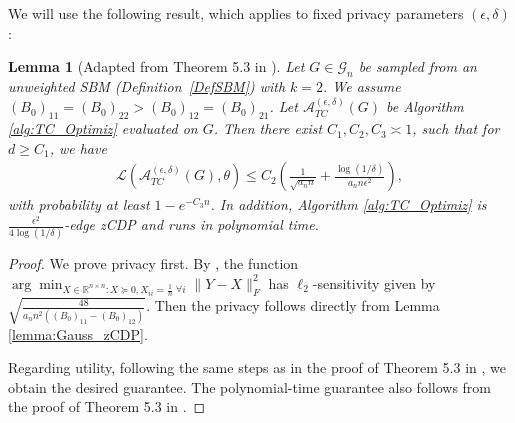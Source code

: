 \documentclass{article}
\newtheorem{lemma}{Lemma}
\newcommand{\real}{\mathbb{R}}
\begin{document}
We will use the following result, which applies to fixed privacy parameters $(\epsilon, \delta)$:

\begin{lemma}[Adapted from Theorem 5.3 in \cite{CheEtal23}]
\label{lemma:ChenPriv+Ut}
Let $G \in \mathcal{G}_n$ be sampled from an unweighted SBM (Definition~\ref{DefSBM}) with $k = 2$. We assume $(B_0)_{11} = (B_0)_{22} > (B_0)_{12} = (B_0)_{21}$. Let $\mathcal{A}_{TC}^{(\epsilon, \delta)}(G)$ be Algorithm \ref{alg:TC_Optimiz} evaluated on $G$. Then there exist $C_1, C_2, C_3 \asymp 1$, such that for $d \geq C_1$, we have  
\begin{align*}
\mathcal{L}\left(\mathcal{A}_{TC}^{(\epsilon, \delta)}(G), \theta\right) \leq C_2\left(\frac{1}{\sqrt{a_n n}} + \frac{\log(1/\delta)}{a_n n\epsilon^2}\right),
\end{align*}
with probability at least $1 - e^{-C_3n}$. In addition, Algorithm \ref{alg:TC_Optimiz} is $\frac{\epsilon^2}{4\log(1/\delta)}$-edge zCDP and runs in polynomial time.
\end{lemma}

\begin{proof}
We prove privacy first. By \cite{CheEtal23}, the function $\arg\min_{X \in \real^{n \times n}: X \succeq 0, X_{ii} = \frac{1}{n} \; \forall i} \|Y-X\|_F^2$ has $\ell_2$-sensitivity given by $\sqrt{\frac{48}{a_n n^2((B_0)_{11} - (B_0)_{12})}}$. Then the privacy follows directly from Lemma \ref{lemma:Gauss_zCDP}.

Regarding utility, following the same steps as in the proof of Theorem 5.3 in \cite{CheEtal23}, we obtain the desired guarantee. The polynomial-time guarantee also follows from the proof of Theorem 5.3 in \cite{CheEtal23}.
\end{proof}
\end{document}
